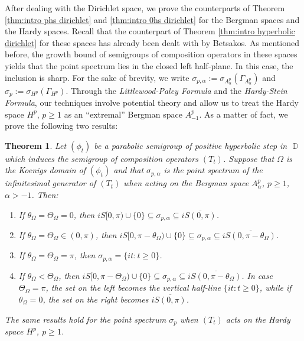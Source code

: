 \documentclass[11pt]{amsart}
\numberwithin{equation}{section}
\newtheorem{theorem}{Theorem}[section]
\theoremstyle{definition}
\DeclareMathOperator{\D}{\mathbb{D}}
\begin{document}
	After dealing with the Dirichlet space, we prove the counterparts of Theorem \ref{thm:intro phs dirichlet} and \ref{thm:intro 0hs dirichlet} for the Bergman spaces and the Hardy spaces. Recall that the counterpart of Theorem \ref{thm:intro hyperbolic dirichlet} for these spaces has already been dealt with by Betsakos. As mentioned before, the growth bound of semigroups of composition operators in these spaces yields that the point spectrum lies in the closed left half-plane. In this case, the inclusion is sharp. For the sake of brevity, we write $\sigma_{p,\alpha}:=\sigma_{A_\alpha^p}(\Gamma_{A_\alpha^p})$ and $\sigma_p:=\sigma_{H^p}(\Gamma_{H^p})$. Through the \textit{Littlewood-Paley Formula} and the \textit{Hardy-Stein Formula}, our techniques involve potential theory and allow us to treat the Hardy space $H^p$, $p\ge1$ as an ``extremal'' Bergman space $A_{-1}^p$. As a matter of fact, we prove the following two results:
	
	\begin{theorem}\label{thm:intro bergman phs}
		Let $(\phi_t)$ be a parabolic semigroup of positive hyperbolic step in $\D$ which induces the semigroup of composition operators $(T_t)$. Suppose that $\Omega$ is the Koenigs domain of $(\phi_t)$ and that $\sigma_{p,\alpha}$ is the point spectrum of the infinitesimal generator of $(T_t)$ when acting on the Bergman space $A_\alpha^p$, $p\ge1$, $\alpha>-1$. Then:
		\begin{enumerate}
			\item[\textup{(a)}] If $\theta_\Omega=\Theta_\Omega=0$, then $iS[0,\pi)\cup\{0\}\subseteq\sigma_{p,\alpha}\subseteq i\overline{S(0,\pi)}$.
			\item[\textup{(b)}] If $\theta_\Omega=\Theta_\Omega\in(0,\pi)$, then $iS[0,\pi-\theta_\Omega)\cup\{0\}\subseteq \sigma_{p,\alpha} \subseteq i\overline{S(0,\pi-\theta_\Omega)}$.
			\item[\textup{(c)}] If $\theta_\Omega=\Theta_\Omega=\pi$, then $\sigma_{p,\alpha}=\{it:t\ge0\}$.
			\item[\textup{(d)}] If $\theta_\Omega<\Theta_\Omega$, then $iS[0,\pi-\Theta_\Omega)\cup\{0\}\subseteq\sigma_{p,\alpha}\subseteq i\overline{S(0,\pi-\theta_\Omega)}$. In case $\Theta_\Omega=\pi$, the set on the left becomes the vertical half-line $\{it:t\ge0\}$, while if $\theta_\Omega=0$, the set on the right becomes $i\overline{S(0,\pi)}$.
		\end{enumerate}
		The same results hold for the point spectrum $\sigma_p$ when $(T_t)$ acts on the Hardy space $H^p$, $p\ge1$.
	\end{theorem}
	
\end{document}
